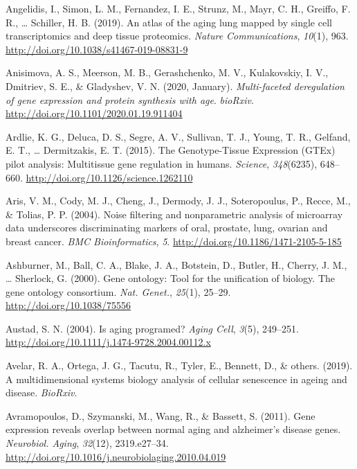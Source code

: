 \documentclass[12pt,twoside]{unicam}
\begin{document}
\begin{cslreferences}
\leavevmode\hypertarget{ref-Angelidis2019}{}%
Angelidis, I., Simon, L. M., Fernandez, I. E., Strunz, M., Mayr, C. H., Greiffo, F. R., \ldots{} Schiller, H. B. (2019). An atlas of the aging lung mapped by single cell transcriptomics and deep tissue proteomics. \emph{Nature Communications}, \emph{10}(1), 963. \url{http://doi.org/10.1038/s41467-019-08831-9}

\leavevmode\hypertarget{ref-Anisimova2020}{}%
Anisimova, A. S., Meerson, M. B., Gerashchenko, M. V., Kulakovskiy, I. V., Dmitriev, S. E., \& Gladyshev, V. N. (2020, January). \emph{Multi-faceted deregulation of gene expression and protein synthesis with age}. \emph{bioRxiv}. \url{http://doi.org/10.1101/2020.01.19.911404}

\leavevmode\hypertarget{ref-Ardlie2015}{}%
Ardlie, K. G., Deluca, D. S., Segre, A. V., Sullivan, T. J., Young, T. R., Gelfand, E. T., \ldots{} Dermitzakis, E. T. (2015). The Genotype-Tissue Expression (GTEx) pilot analysis: Multitissue gene regulation in humans. \emph{Science}, \emph{348}(6235), 648--660. \url{http://doi.org/10.1126/science.1262110}

\leavevmode\hypertarget{ref-Aris2004}{}%
Aris, V. M., Cody, M. J., Cheng, J., Dermody, J. J., Soteropoulus, P., Recce, M., \& Tolias, P. P. (2004). Noise filtering and nonparametric analysis of microarray data underscores discriminating markers of oral, prostate, lung, ovarian and breast cancer. \emph{BMC Bioinformatics}, \emph{5}. \url{http://doi.org/10.1186/1471-2105-5-185}

\leavevmode\hypertarget{ref-Ashburner2000}{}%
Ashburner, M., Ball, C. A., Blake, J. A., Botstein, D., Butler, H., Cherry, J. M., \ldots{} Sherlock, G. (2000). Gene ontology: Tool for the unification of biology. The gene ontology consortium. \emph{Nat. Genet.}, \emph{25}(1), 25--29. \url{http://doi.org/10.1038/75556}

\leavevmode\hypertarget{ref-Austad2004}{}%
Austad, S. N. (2004). Is aging programed? \emph{Aging Cell}, \emph{3}(5), 249--251. \url{http://doi.org/10.1111/j.1474-9728.2004.00112.x}

\leavevmode\hypertarget{ref-Avelar2019}{}%
Avelar, R. A., Ortega, J. G., Tacutu, R., Tyler, E., Bennett, D., \& others. (2019). A multidimensional systems biology analysis of cellular senescence in ageing and disease. \emph{BioRxiv}.

\leavevmode\hypertarget{ref-Avramopoulos2011}{}%
Avramopoulos, D., Szymanski, M., Wang, R., \& Bassett, S. (2011). Gene expression reveals overlap between normal aging and alzheimer's disease genes. \emph{Neurobiol. Aging}, \emph{32}(12), 2319.e27--34. \url{http://doi.org/10.1016/j.neurobiolaging.2010.04.019}


\end{cslreferences}
\end{document}
